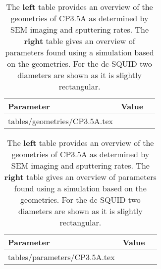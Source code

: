 \begin{table}
	\begin{subtable}{.6\linewidth}
		\begin{tabular}[t]{@{}lrr@{}}
			\toprule
			Parameter & Value \\ \midrule
			\expandableinput tables/geometries/CP3.5A.tex
			\bottomrule
		\end{tabular}
    \end{subtable}
    \hfill
    \begin{subtable}{.3\linewidth}
    	\flushright
    	\begin{tabular}[t]{@{}lrr@{}}
    		\toprule
    		Parameter & Value \\ \midrule
    		\expandableinput tables/parameters/CP3.5A.tex
    		\bottomrule
    	\end{tabular}
    \end{subtable}
    \caption{The \textbf{left} table provides an overview of the geometries of CP3.5A as determined by SEM imaging and sputtering rates. The \textbf{right} table gives an overview of parameters found using a simulation based on the geometries. For the dc-SQUID two diameters are shown as it is slightly rectangular.}
    \label{tab:CP3.5A-geometries}
\end{table}